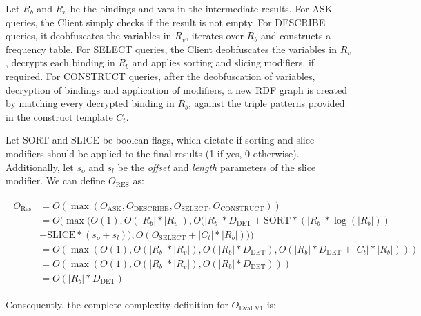 Let $R_b$ and $R_v$ be the bindings and vars in the intermediate results. For ASK queries, the Client simply checks if the result is not empty. For DESCRIBE queries, it deobfuscates the variables in $R_v$, iterates over $R_b$ and constructs a frequency table. For SELECT queries, the Client deobfuscates the variables in $R_v$, decrypts each binding in $R_b$ and applies sorting and slicing modifiers, if required. For CONSTRUCT queries, after the deobfuscation of variables, decryption of bindings and application of modifiers, a new \gls{RDF} graph is created by matching every decrypted binding in $R_b$, against the triple patterns provided in the construct template $C_t$.

Let SORT and SLICE be boolean flags, which dictate if sorting and slice modifiers should be applied to the final results (1 if yes, 0 otherwise). Additionally, let $s_o$ and $s_l$ be the \emph{offset} and \emph{length} parameters of the slice modifier. We can define  $O_{\text{RES}}$ as:

\begin{align}
    \label{equation:query-evaluation-v1-res}
    \begin{split}
        O_{\text{Res V1}} &= O( \max(O_{\text{ASK}}, O_{\text{DESCRIBE}}, O_{\text{SELECT}}, O_{\text{CONSTRUCT}}) ) \\
        &= O( \max(O(1), O(|R_b|*|R_v|), O(|R_b|*D_{\text{DET}} + \text{SORT}*(|R_b|* \log(|R_b|)) \\
        &+ \text{SLICE}*(s_o + s_l) ) , O(O_{\text{SELECT}} + |C_t| * |R_b|)) ) \\
        &= O( \max(O(1), O(|R_b|*|R_v|), O(|R_b|*D_{\text{DET}}) , O(|R_b|*D_{\text{DET}} + |C_t| * |R_b|)) ) \\
        &= O( \max(O(1), O(|R_b|*|R_v|), O(|R_b|*D_{\text{DET}})) ) \\
        &= O( |R_b|*D_{\text{DET}} )
    \end{split}
\end{align}

Consequently, the complete complexity definition for $O_{\text{Eval V1}}$ is:

